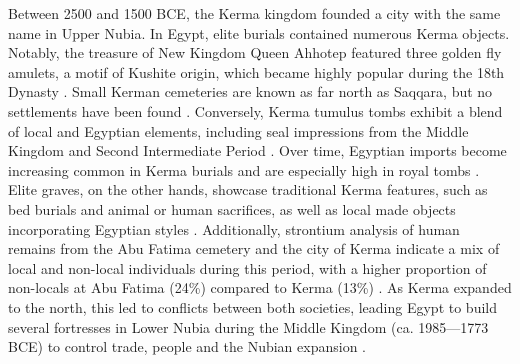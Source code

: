 Between 2500 and 1500 BCE, the Kerma kingdom founded a city with the same name in Upper Nubia. In Egypt, elite burials contained numerous Kerma objects. Notably, the treasure of New Kingdom Queen Ahhotep featured three golden fly amulets, a motif of Kushite origin, which became highly popular during the 18th Dynasty \parencite[p.~188]{williamsKushWiderWorld2020}. Small Kerman cemeteries are known as far north as Saqqara, but no settlements have been found \parencite[p.~298-300]{meurerNubiansEgyptEarly2020}. Conversely, Kerma tumulus tombs exhibit a blend of local and Egyptian elements, including seal impressions from the Middle Kingdom and Second Intermediate Period \parencites[p.~190-191]{williamsKushWiderWorld2020}[p.~205-206]{bonnetCitiesKermaPnubsDokki2020}. Over time, Egyptian imports become increasing common in Kerma burials and are especially high in royal tombs \parencite[p.~216-219]{bonnetEasternCemeteryKerma2020}. Elite graves, on the other hands, showcase traditional Kerma features, such as bed burials and animal or human sacrifices, as well as local made objects incorporating Egyptian styles \parencite[p.~118]{emberlingEarlyKushKingdom2022}. Additionally, strontium analysis of human remains from the Abu Fatima cemetery and the city of Kerma indicate a mix of local and non-local individuals during this period, with a higher proportion of non-locals at Abu Fatima (24\%) compared to Kerma (13\%) \parencite[p.~377]{schraderIntraregional87Sr86Sr2019}. As Kerma expanded to the north, this led to conflicts between both societies, leading Egypt to build several fortresses in Lower Nubia during the Middle Kingdom (ca. 1985---1773 BCE) to control trade, people and the Nubian expansion \parencites[p.~130-135]{emberlingPastoralStatesComparative2014}[p.~230]{honeggerHolocenePrehistoryUpper2019}[p.~219-220]{bonnetEasternCemeteryKerma2020}[p.271]{bestockEgyptianFortressesColonization2020}[p.~130]{emberlingEarlyKushKingdom2022}.


